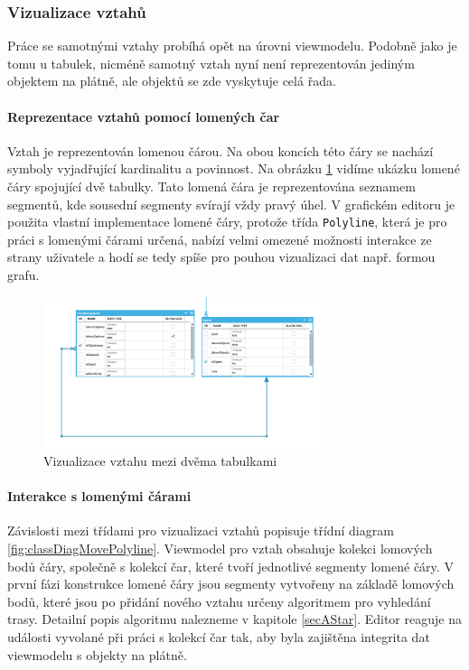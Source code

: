 \documentclass[czech,bachelor,public,dept460,male,oneside]{diploma}
\begin{document}
		\subsubsection{Vizualizace vztahů}
		Práce se samotnými vztahy probíhá opět na úrovni viewmodelu. Podobně jako je tomu u tabulek, nicméně samotný vztah nyní není reprezentován jediným objektem na plátně, ale objektů se zde vyskytuje celá řada. 
		
		\paragraph{Reprezentace vztahů pomocí lomených čar}
		Vztah je reprezentován lomenou čárou. Na obou koncích této čáry se nachází symboly vyjadřující kardinalitu a povinnost. Na obrázku \ref{fig:screenPolyline} vidíme ukázku lomené čáry spojující dvě tabulky. Tato lomená čára je reprezentována seznamem segmentů, kde sousední segmenty svírají vždy pravý úhel. V grafickém editoru je použita vlastní implementace lomené čáry, protože třída \texttt{Polyline}, která je pro práci s lomenými čárami určená, nabízí velmi omezené možnosti interakce ze strany uživatele a hodí se tedy spíše pro pouhou vizualizaci dat např. formou grafu.
		
		\begin{figure}[H]
			\centering
			\includegraphics[width=0.74\textwidth]{Figures/ScreenPolyline}
			\caption{Vizualizace vztahu mezi dvěma tabulkami}
			\label{fig:screenPolyline}
		\end{figure}
		
		\paragraph{Interakce s lomenými čárami}
		Závislosti mezi třídami pro vizualizaci vztahů popisuje třídní diagram \ref{fig:classDiagMovePolyline}. Viewmodel pro vztah obsahuje kolekci lomových bodů čáry, společně s kolekcí čar, které tvoří jednotlivé segmenty lomené čáry. V první fázi konstrukce lomené čáry jsou segmenty vytvořeny na základě lomových bodů, které jsou po přidání nového vztahu určeny algoritmem pro vyhledání trasy. Detailní popis algoritmu nalezneme v kapitole \ref{secAStar}. Editor reaguje na události vyvolané při práci s kolekcí čar tak, aby byla zajištěna integrita dat viewmodelu s objekty na plátně. 
		
\end{document}
